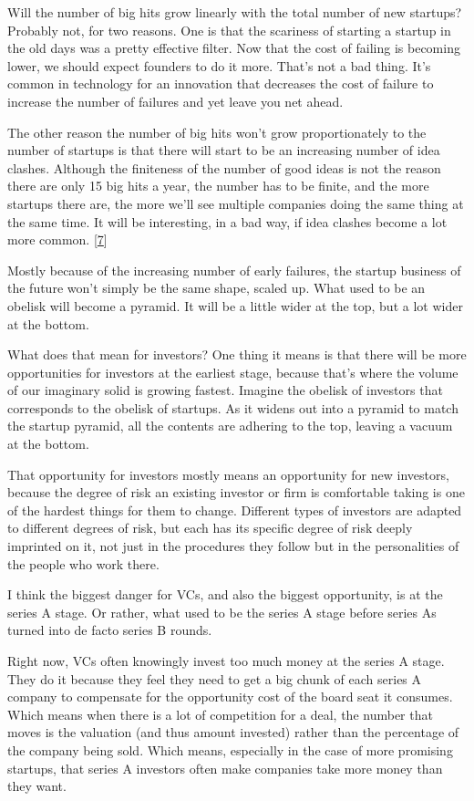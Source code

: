 Will the number of big hits grow linearly with the total number of new
startups? Probably not, for two reasons. One is that the scariness of
starting a startup in the old days was a pretty effective filter. Now
that the cost of failing is becoming lower, we should expect founders to
do it more. That's not a bad thing. It's common in technology for an
innovation that decreases the cost of failure to increase the number of
failures and yet leave you net ahead.

The other reason the number of big hits won't grow proportionately to
the number of startups is that there will start to be an increasing
number of idea clashes. Although the finiteness of the number of good
ideas is not the reason there are only 15 big hits a year, the number
has to be finite, and the more startups there are, the more we'll see
multiple companies doing the same thing at the same time. It will be
interesting, in a bad way, if idea clashes become a lot more common.
{[}\hyperref[f7n]{7}{]}

Mostly because of the increasing number of early failures, the startup
business of the future won't simply be the same shape, scaled up. What
used to be an obelisk will become a pyramid. It will be a little wider
at the top, but a lot wider at the bottom.

What does that mean for investors? One thing it means is that there will
be more opportunities for investors at the earliest stage, because
that's where the volume of our imaginary solid is growing fastest.
Imagine the obelisk of investors that corresponds to the obelisk of
startups. As it widens out into a pyramid to match the startup pyramid,
all the contents are adhering to the top, leaving a vacuum at the
bottom.

That opportunity for investors mostly means an opportunity for new
investors, because the degree of risk an existing investor or firm is
comfortable taking is one of the hardest things for them to change.
Different types of investors are adapted to different degrees of risk,
but each has its specific degree of risk deeply imprinted on it, not
just in the procedures they follow but in the personalities of the
people who work there.

I think the biggest danger for VCs, and also the biggest opportunity, is
at the series A stage. Or rather, what used to be the series A stage
before series As turned into de facto series B rounds.

Right now, VCs often knowingly invest too much money at the series A
stage. They do it because they feel they need to get a big chunk of each
series A company to compensate for the opportunity cost of the board
seat it consumes. Which means when there is a lot of competition for a
deal, the number that moves is the valuation (and thus amount invested)
rather than the percentage of the company being sold. Which means,
especially in the case of more promising startups, that series A
investors often make companies take more money than they want.

